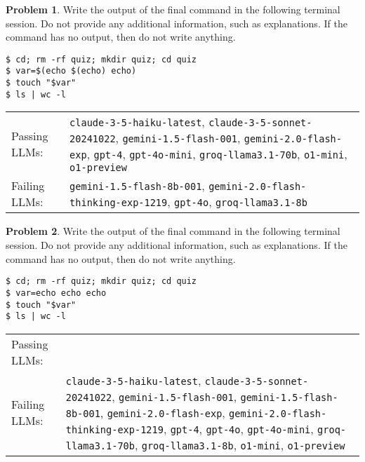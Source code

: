 \documentclass[10pt]{article}
\theoremstyle{definition}
\newtheorem{problem}{Problem}
\begin{document}
\begin{samepage}

\begin{problem}
Write the output of the final command in the following terminal session.
Do not provide any additional information,
such as explanations.
If the command has no output,
then do not write anything.

\end{problem}
\begin{lstlisting}
$ cd; rm -rf quiz; mkdir quiz; cd quiz
$ var=$(echo $(echo) echo)
$ touch "$var"
$ ls | wc -l
\end{lstlisting}


\noindent
\begin{tabular}{p{1.0in}L{5in}}
Passing LLMs: & {\lstinline$claude-3-5-haiku-latest$}, {\lstinline$claude-3-5-sonnet-20241022$}, {\lstinline$gemini-1.5-flash-001$}, {\lstinline$gemini-2.0-flash-exp$}, {\lstinline$gpt-4$}, {\lstinline$gpt-4o-mini$}, {\lstinline$groq-llama3.1-70b$}, {\lstinline$o1-mini$}, {\lstinline$o1-preview$} \\
Failing LLMs: & {\lstinline$gemini-1.5-flash-8b-001$}, {\lstinline$gemini-2.0-flash-thinking-exp-1219$}, {\lstinline$gpt-4o$}, {\lstinline$groq-llama3.1-8b$} \\
\end{tabular}

\end{samepage}
\begin{samepage}

\begin{problem}
Write the output of the final command in the following terminal session.
Do not provide any additional information,
such as explanations.
If the command has no output,
then do not write anything.

\end{problem}
\begin{lstlisting}
$ cd; rm -rf quiz; mkdir quiz; cd quiz
$ var=echo echo echo
$ touch "$var"
$ ls | wc -l
\end{lstlisting}


\noindent
\begin{tabular}{p{1.0in}L{5in}}
Passing LLMs: &  \\
Failing LLMs: & {\lstinline$claude-3-5-haiku-latest$}, {\lstinline$claude-3-5-sonnet-20241022$}, {\lstinline$gemini-1.5-flash-001$}, {\lstinline$gemini-1.5-flash-8b-001$}, {\lstinline$gemini-2.0-flash-exp$}, {\lstinline$gemini-2.0-flash-thinking-exp-1219$}, {\lstinline$gpt-4$}, {\lstinline$gpt-4o$}, {\lstinline$gpt-4o-mini$}, {\lstinline$groq-llama3.1-70b$}, {\lstinline$groq-llama3.1-8b$}, {\lstinline$o1-mini$}, {\lstinline$o1-preview$} \\
\end{tabular}

\end{samepage}
\end{document}
